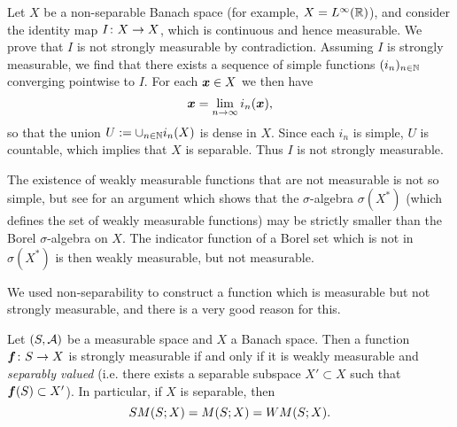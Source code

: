 \begin{example}\label{eg:non-sm}
  Let $X$ be a non-separable Banach space (for example, $X = L^\infty(\mathbb{R})$), and consider the identity map $I \colon X \rightarrow X$, which is continuous and hence measurable.
  We prove that $I$ is not strongly measurable by contradiction.
  Assuming $I$ is strongly measurable, we find that there exists a sequence of simple functions $(i_n)_{n \in \mathbb{N}}$ converging pointwise to $I$.
  For each $\bm{x} \in X$ we then have
  \begin{equation*}
    \bm{x} = \lim_{n \to \infty} i_n(\bm{x}),
  \end{equation*}
  so that the union $U := \cup_{n \in \mathbb{N}} i_n(X)$ is dense in $X$.
  Since each $i_n$ is simple, $U$ is countable, which implies that $X$ is separable.
  Thus $I$ is not strongly measurable.
\end{example}

\begin{rmk}
  The existence of weakly measurable functions that are not measurable is not so simple, but see \cite[Example 1.4.3]{HNVW16} for an argument which shows that the $\sigma$-algebra $\sigma(X^*)$ (which defines the set of weakly measurable functions) may be strictly smaller than the Borel $\sigma$-algebra on $X$.
  The indicator function of a Borel set which is not in $\sigma(X^*)$ is then weakly measurable, but not measurable.
\end{rmk}

We used non-separability to construct a function which is measurable but not strongly measurable, and there is a very good reason for this.

\begin{thm}\label{thm:Pettis-measurability}
  Let $(S,\mathcal{A})$ be a measurable space and $X$ a Banach space.
  Then a function $\bm{f} \colon S \rightarrow X$ is strongly measurable if and only if it is weakly measurable and \emph{separably valued} (i.e. there exists a separable subspace $X' \subset X$ such that $\bm{f}(S) \subset X'$).
  In particular, if $X$ is separable, then
  \begin{equation*}
    SM(S;X) = M(S;X) = WM(S;X).
  \end{equation*}
\end{thm}

